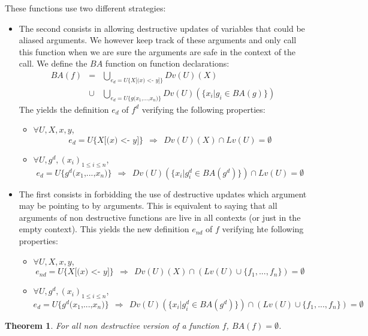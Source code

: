 \documentclass[12pt,a4paper]{article}
\newcommand{\cl}[1]{\texttt{#1}}
\newtheorem{theorem}{Theorem}
\newcommand{\ucont}[1]{\{#1\}}
\begin{document}
These functions use two different strategies:
\begin{itemize}
\item The second consists in allowing destructive updates of variables that could be aliased arguments. We however keep track of these arguments and only call this function when we are sure the arguments are safe in the context of the call. We define the $BA$ function on function declarations:
\begin{eqnarray*}
BA(f) &=& \bigcup_{e_d = U\ucont{X\cl{[(}x \cl{) <- } y \cl{]} }}  Dv(U)(X) \\
& \cup & \bigcup_{e_d = U\ucont{g\cl{(} x_1\cl{,} ... \cl{,} x_n \cl{)}}} Dv(U)( \{ x_i | g_i \in BA(g) \})
\end{eqnarray*}
The yields the definition $e_d$ of $f^d$ verifying the following properties:
\begin{itemize}
\item $\forall U, X, x, y$,
$$ e_d = U\ucont{X\cl{[(}x \cl{) <- } y \cl{]}} \ \ \Longrightarrow \ \  Dv(U)(X) \cap Lv(U) = \emptyset $$
\item $\forall U, g^d, (x_i)_{1 \leq i \leq n}$,
$$ e_d = U\ucont{g^d\cl{(}x_1 \cl{,} ... \cl{,} x_n \cl{)}} \ \ \Longrightarrow \ \  Dv(U)( \{ x_i | g^d_i \in BA(g^d) \}) \cap Lv(U) = \emptyset $$
\end{itemize}
\item The first consists in forbidding the use of destructive updates which argument may be pointing to by arguments. This is equivalent to saying that all arguments of non destructive functions are live in all contexts (or just in the empty context).
This yields the new definition $e_{nd}$ of $f$ verifying hte following properties:
\begin{itemize}
\item $\forall U, X, x, y$,
$$ e_{nd} = U\ucont{X\cl{[(}x \cl{) <- } y \cl{]}} \ \ \Longrightarrow \ \  Dv(U)(X) \cap \left( Lv(U) \cup \{f_1, ... , f_n \} \right) = \emptyset $$
\item $\forall U, g^d, (x_i)_{1 \leq i \leq n}$,
$$ e_d = U\ucont{g^d\cl{(}x_1 \cl{,} ... \cl{,} x_n \cl{)}} \ \ \Longrightarrow \ \  Dv(U)( \{ x_i | g^d_i \in BA(g^d) \}) \cap \left( Lv(U) \cup \{f_1, ... , f_n \} \right) = \emptyset $$
\end{itemize}
\end{itemize}
\begin{theorem}
For all non destructive version of a function $f$, $ BA(f) = \emptyset$.
\end{theorem}
\end{document}
